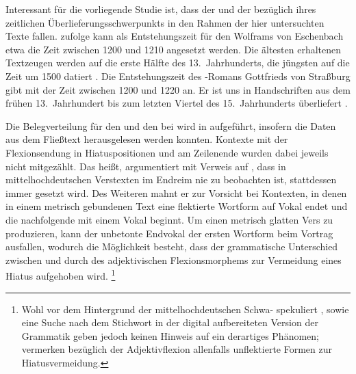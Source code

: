 Interessant für die vorliegende Studie ist, dass der  und der
 bezüglich ihres zeitlichen
Überlieferungsschwerpunkts in den Rahmen der hier
untersuchten Texte fallen. \citet[1378]{bumke1999} zufolge kann als
Entstehungszeit für den  Wolframs von Eschenbach etwa die Zeit
zwischen 1200 und 1210 angesetzt werden. Die ältesten erhaltenen Textzeugen
werden auf die erste Hälfte des 13.~Jahrhunderts, die jüngsten auf die Zeit um
1500 datiert
\autocites[1381]{bumke1999}[vgl.~auch][s.\,v.~\textit{Wolfram von Eschenbach:
}]{hsc}. Die Entstehungszeit des -Romans Gottfrieds
von Straßburg gibt \citet[155]{kuhn1982} mit der
Zeit zwischen 1200 und 1220 an. Er ist uns in Handschriften aus dem frühen
13.~Jahrhundert bis zum letzten Viertel des 15.~Jahrhunderts überliefert
\autocite[vgl.][s.\,v.~\textit{Gottfried von Straßburg: }]{hsc}.

Die Belegverteilung für den  und den  bei
\citet{askedal1973} wird in  aufgeführt, insofern die
Daten aus dem Fließtext herausgelesen werden konnten. Kontexte mit der
Flexionsendung in Hiatuspositionen und am Zeilenende wurden dabei jeweils nicht
mitgezählt. Das heißt, \citet[89--91]{askedal1973} argumentiert mit Verweis auf
\citet[662--663]{grimm1870}, dass in mittelhochdeutschen
Verstexten im Endreim nie  zu beobachten ist, stattdessen immer
 gesetzt wird. Des Weiteren mahnt er zur Vorsicht bei Kontexten, in
denen in einem metrisch gebundenen Text eine flektierte Wortform auf Vokal
endet und die nachfolgende mit einem Vokal beginnt. Um einen metrisch glatten
Vers zu produzieren, kann der unbetonte Endvokal der ersten Wortform beim
Vortrag ausfallen, wodurch die Möglichkeit besteht, dass der grammatische
Unterschied zwischen  und  durch  des
adjektivischen Flexionsmorphems zur Vermeidung eines Hiatus
aufgehoben wird.%
%
	\footnote{Wohl vor dem Hintergrund der
		mittelhochdeutschen Schwa-
		\autocites{lindgren1953}[109--111]{paul2007} spekuliert
		\citet[91]{askedal1973},  \citet[27, 109--111,
		203]{paul2007} sowie eine Suche nach dem Stichwort  in der
		digital aufbereiteten Version der Grammatik geben jedoch keinen Hinweis
		auf ein derartiges Phänomen; \citet[244]{ksw2} vermerken bezüglich der
		Adjektivflexion allenfalls unflektierte Formen
		zur Hiatusvermeidung.}
		
